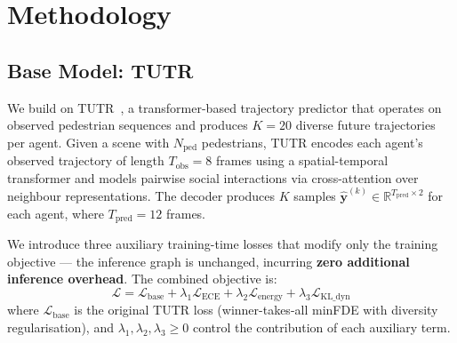 %
%



\section{Methodology}
\label{sec:method}

\subsection{Base Model: TUTR}
\label{sec:method:tutr}

We build on TUTR~\cite{shi2023tutr}, a transformer-based trajectory predictor
that operates on observed pedestrian sequences and produces \(K=20\) diverse
future trajectories per agent. Given a scene with \(N_{\text{ped}}\)
pedestrians, TUTR encodes each agent's observed trajectory of length
\(T_{\text{obs}} = 8\) frames using a spatial-temporal transformer and models
pairwise social interactions via cross-attention over neighbour representations.
The decoder produces \(K\) samples
\(\hat{\mathbf{y}}^{(k)} \in \mathbb{R}^{T_{\text{pred}} \times 2}\)
for each agent, where \(T_{\text{pred}} = 12\) frames.

We introduce three auxiliary training-time losses that modify only the training
objective --- the inference graph is unchanged, incurring \textbf{zero
additional inference overhead}. The combined objective is:
%
\begin{equation}
  \mathcal{L} = \mathcal{L}_{\text{base}} +
                \lambda_1 \mathcal{L}_{\text{ECE}} +
                \lambda_2 \mathcal{L}_{\text{energy}} +
                \lambda_3 \mathcal{L}_{\text{KL\_dyn}}
  \label{eq:combined}
\end{equation}
%
where \(\mathcal{L}_{\text{base}}\) is the original TUTR loss (winner-takes-all
minFDE with diversity regularisation), and
\(\lambda_1, \lambda_2, \lambda_3 \geq 0\) control the contribution of each
auxiliary term.

